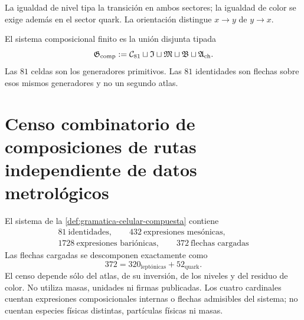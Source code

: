 La igualdad de nivel tipa la transición en ambos sectores; la igualdad de
color se exige además en el sector quark. La orientación distingue \(x\to y\)
de \(y\to x\).

\begin{definition}
\label{def:gramatica-celular-compuesta}
El sistema composicional finito es la unión disjunta tipada
\[
 \mathfrak G_{\rm comp}
 :=
 \mathcal C_{81}
 \sqcup\mathfrak I
 \sqcup\mathfrak M
 \sqcup\mathfrak B
 \sqcup\mathfrak A_{\rm ch}.
\]
Las \(81\) celdas son los generadores primitivos. Las \(81\) identidades son
flechas sobre esos mismos generadores y no un segundo atlas.
\end{definition}

\section{Censo combinatorio de composiciones de rutas independiente de datos metrológicos}
\label{sec:censo-composicional-rev6}

\begin{theorem}
\label{thm:censo-gramatica-composicional-rev6}
El sistema de la \cref{def:gramatica-celular-compuesta} contiene
\[
 \boxed{\begin{gathered}
        81\ \text{identidades},\qquad
        432\ \text{expresiones mesónicas},\\
        1728\ \text{expresiones bariónicas},\qquad
        372\ \text{flechas cargadas}
 \end{gathered}}
\]
Las flechas cargadas se descomponen exactamente como
\[
 372=320_{\text{leptónicas}}+52_{\text{quark}}.
\]
El censo depende sólo del atlas, de su inversión, de los niveles y del
residuo de color. No utiliza masas, unidades ni firmas publicadas.
Los cuatro cardinales cuentan expresiones composicionales internas o flechas
admisibles del sistema; no cuentan especies físicas distintas, partículas
físicas ni masas.
\end{theorem}

